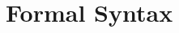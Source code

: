 \documentclass[10pt,oneside]{book}
\begin{document}


\appendix
\chapter{Formal Syntax}\label{sec:bnf}
\end{document}
